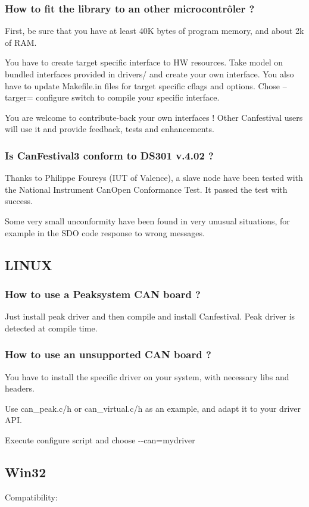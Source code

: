 \documentclass[12pt,twoside]{article}
\begin{document}
\subsubsection{How to fit the library to an other microcontr\^oler ?}
First, be sure that you have at least 40K bytes of program memory, and
about 2k of RAM. 

You have to create target specific interface to HW resources. Take model
on bundled interfaces provided in drivers/ and create your own
interface. You also have to update Makefile.in files for target
specific cflags and options. Chose {--}targer= configure switch to
compile your specific interface.

You are welcome to contribute{}-back your own interfaces ! Other
Canfestival users will use it and provide feedback, tests and
enhancements.

\subsubsection{Is CanFestival3 conform to DS301 v.4.02 ?}
Thanks to Philippe Foureys (IUT of Valence), a slave node have been
tested with the National Instrument CanOpen Conformance Test. It passed
the test with success.

Some very small unconformity have been found in very unusual situations,
for example in the SDO code response to wrong messages.

\subsection{LINUX}
\subsubsection{How to use a Peaksystem CAN board ?}
Just install peak driver and then compile and install Canfestival. Peak
driver is detected at compile time.

\subsubsection{How to use an unsupported CAN board ?}
You have to install the specific driver on your system, with necessary
libs and headers. 

Use can\_peak.c/h or can\_virtual.c/h as an example, and adapt it to
your driver API.

Execute configure script and choose {}-{}-can=mydriver

\subsection{Win32}
Compatibility:
\end{document}
